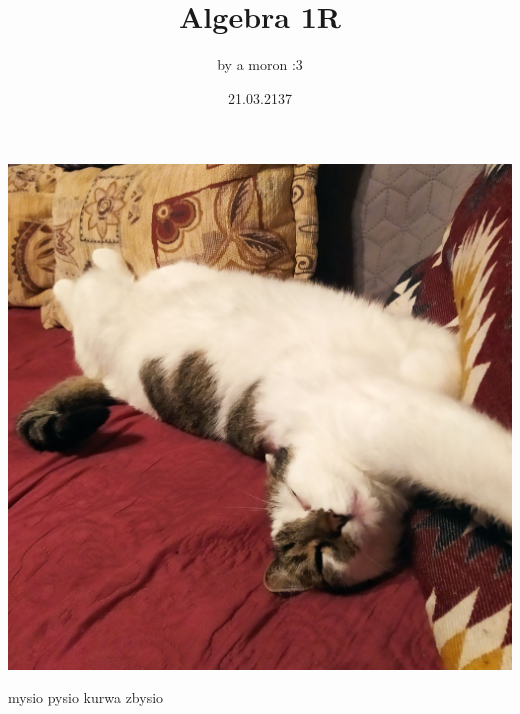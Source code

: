 \documentclass{article}[13pt]
\title {Algebra 1R}
\author{by a moron :3}
\date {21.03.2137}
\begin{document}

\maketitle

\newpage

\begin{center}
    \includegraphics[width=\textwidth]{./kytel.jpg}
\end{center}

\newpage

mysio pysio kurwa zbysio

\newpage



\newpage


\end{document}
